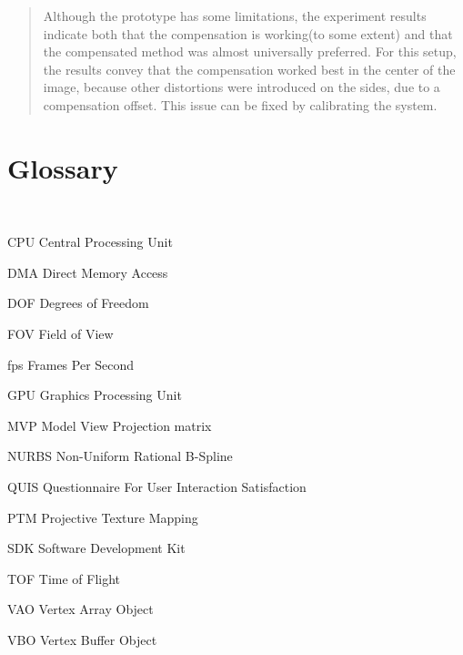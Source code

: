 \documentclass[]{article}
\newcommand{\abbrlabel}[1]{\makebox[3cm][l]{\textbf{#1}\ }} %
\newenvironment{abbreviations}{\begin{list}{}{\renewcommand{\makelabel}{\abbrlabel}}}{\end{list}}
\begin{document}
\begin{abstract}


Although the prototype has some limitations, the experiment results indicate both that the compensation is working(to some extent) and that the compensated method was almost universally preferred. For this setup, the results convey that the compensation worked best in the center of the image, because other distortions were introduced on the sides, due to a compensation offset. This issue can be fixed by calibrating the system.

\end{abstract}

\newpage

\renewcommand{\thepage}{\roman{page}}%
\setcounter{page}{1}
\thispagestyle{empty}
\section*{Glossary}\mbox{}\\

\begin{abbreviations}
\item[CPU] Central Processing Unit
\item[DMA] Direct Memory Access
\item[DOF] Degrees of Freedom
\item[FOV] Field of View
\item[fps] Frames Per Second
\item[GPU] Graphics Processing Unit 
\item[MVP] Model View Projection matrix
\item[NURBS] Non-Uniform Rational B-Spline
\item[QUIS] Questionnaire For User Interaction Satisfaction
\item[PTM] Projective Texture Mapping
\item[SDK] Software Development Kit
\item[TOF] Time of Flight 
\item[VAO] Vertex Array Object 
\item[VBO] Vertex Buffer Object 
\end{abbreviations}
\newpage
\tableofcontents
\end{document}
